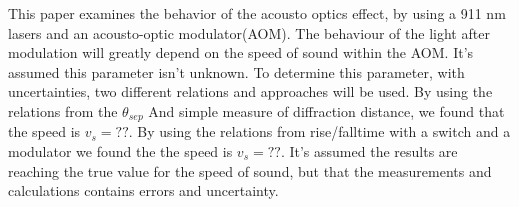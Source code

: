 \documentclass[main]{subfiles}
\begin{document}
This paper examines the behavior of the acousto optics effect, by using a 911 nm lasers and  an acousto-optic modulator(AOM). The behaviour of the light after modulation will greatly depend on the speed of sound within the AOM. It’s assumed this parameter isn’t unknown. To determine this parameter, with uncertainties, two different relations and approaches will be used. By using the relations from the $\theta_{sep}$ And simple measure of diffraction distance, we found that the speed is $v_s = ??$. By using the relations from rise/falltime with a switch and a modulator we found the the speed is $v_s = ??$. It’s assumed the results are reaching the true value for the speed of sound, but that the measurements and calculations contains errors and uncertainty.
\end{document}
